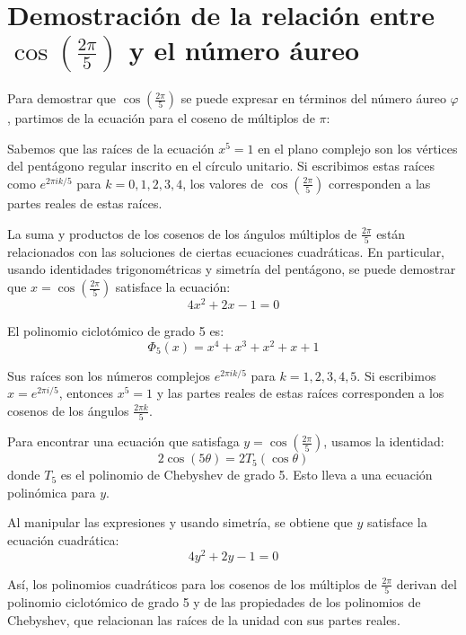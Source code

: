 \section{Demostración de la relación entre $\cos\left(\frac{2\pi}{5}\right)$ y el número áureo}
Para demostrar que $\cos\left(\frac{2\pi}{5}\right)$ se puede expresar en términos del número áureo $\varphi$, partimos de la ecuación para el coseno de múltiplos de $\pi$:

Sabemos que las raíces de la ecuación $x^5 = 1$ en el plano complejo son los vértices del pentágono regular inscrito en el círculo unitario. Si escribimos estas raíces como $e^{2\pi i k/5}$ para $k=0,1,2,3,4$, los valores de $\cos\left(\frac{2\pi}{5}\right)$ corresponden a las partes reales de estas raíces.

La suma y productos de los cosenos de los ángulos múltiplos de $\frac{2\pi}{5}$ están relacionados con las soluciones de ciertas ecuaciones cuadráticas. En particular, usando identidades trigonométricas y simetría del pentágono, se puede demostrar que $x = \cos\left(\frac{2\pi}{5}\right)$ satisface la ecuación:
\begin{equation*}
4x^2 + 2x - 1 = 0
\end{equation*}

El polinomio ciclotómico de grado 5 es:
\begin{equation*}
\Phi_5(x) = x^4 + x^3 + x^2 + x + 1
\end{equation*}

Sus raíces son los números complejos $e^{2\pi i k/5}$ para $k=1,2,3,4,5$. Si escribimos $x = e^{2\pi i/5}$, entonces $x^5 = 1$ y las partes reales de estas raíces corresponden a los cosenos de los ángulos $\frac{2\pi k}{5}$.

Para encontrar una ecuación que satisfaga $y = \cos\left(\frac{2\pi}{5}\right)$, usamos la identidad:
\begin{equation*}
2\cos(5\theta) = 2T_5(\cos\theta)
\end{equation*}
donde $T_5$ es el polinomio de Chebyshev de grado 5. Esto lleva a una ecuación polinómica para $y$.

Al manipular las expresiones y usando simetría, se obtiene que $y$ satisface la ecuación cuadrática:
\begin{equation*}
4y^2 + 2y - 1 = 0
\end{equation*}

Así, los polinomios cuadráticos para los cosenos de los múltiplos de $\frac{2\pi}{5}$ derivan del polinomio ciclotómico de grado 5 y de las propiedades de los polinomios de Chebyshev, que relacionan las raíces de la unidad con sus partes reales.

